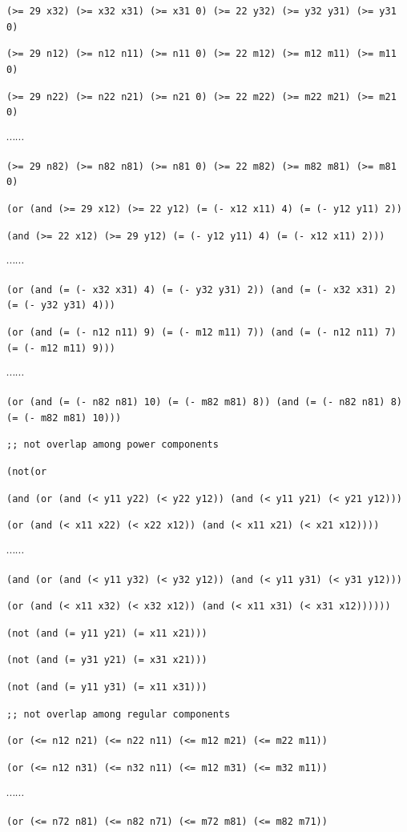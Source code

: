 \documentclass[11pt]{article}
\begin{document}
{{{\tt (>= 29 x32) (>= x32 x31) (>= x31 0) (>= 22 y32) (>= y32 y31) (>= y31 0)}

{\tt (>= 29 n12) (>= n12 n11) (>= n11 0) (>= 22 m12) (>= m12 m11) (>= m11 0)}

{\tt (>= 29 n22) (>= n22 n21) (>= n21 0) (>= 22 m22) (>= m22 m21) (>= m21 0)}

$\cdots \cdots$

{\tt (>= 29 n82) (>= n82 n81) (>= n81 0) (>= 22 m82) (>= m82 m81) (>= m81 0)}

{\tt (or (and (>= 29 x12) (>= 22 y12) (= (- x12 x11) 4) (= (- y12 y11) 2))}

{\tt (and (>= 22 x12) (>= 29 y12) (= (- y12 y11) 4) (= (- x12 x11) 2)))}

$\cdots \cdots$

{\tt (or (and (= (- x32 x31) 4) (= (- y32 y31) 2)) (and (= (- x32 x31) 2) (= (- y32 y31) 4)))}

{\tt (or (and (= (- n12 n11) 9) (= (- m12 m11) 7)) (and (= (- n12 n11) 7) (= (- m12 m11) 9)))}

$\cdots \cdots$

{\tt (or (and (= (- n82 n81) 10) (= (- m82 m81) 8)) (and (= (- n82 n81) 8) (= (- m82 m81) 10)))}

{\tt ;; not overlap among power components}

{\tt (not(or}

{\tt (and (or (and (< y11 y22) (< y22 y12)) (and (< y11 y21) (< y21 y12)))}

{\tt (or (and (< x11 x22) (< x22 x12)) (and (< x11 x21) (< x21 x12))))}

$\cdots \cdots$

{\tt (and (or (and (< y11 y32) (< y32 y12)) (and (< y11 y31) (< y31 y12)))}

{\tt (or (and (< x11 x32) (< x32 x12)) (and (< x11 x31) (< x31 x12))))))}

{\tt (not (and (= y11 y21) (= x11 x21)))}

{\tt (not (and (= y31 y21) (= x31 x21)))}

{\tt (not (and (= y11 y31) (= x11 x31)))}

{\tt ;; not overlap among regular components}

{\tt (or (<= n12 n21) (<= n22 n11) (<= m12 m21) (<= m22 m11))}

{\tt (or (<= n12 n31) (<= n32 n11) (<= m12 m31) (<= m32 m11))}

$\cdots \cdots$

{\tt (or (<= n72 n81) (<= n82 n71) (<= m72 m81) (<= m82 m71))}

}}
\end{document}
